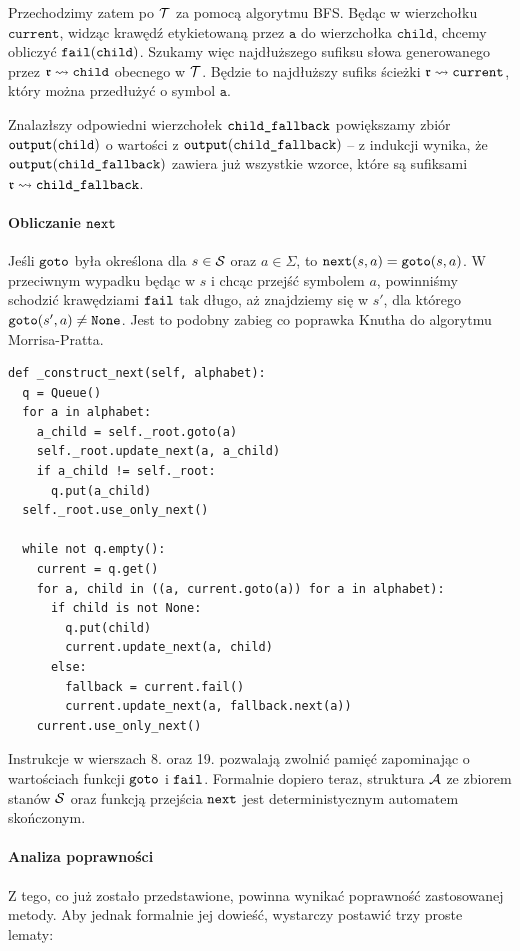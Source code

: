 Przechodzimy zatem po $\operatorname{\mathcal{T}}$ za pomocą algorytmu BFS. Będąc w wierzchołku $\texttt{current}$, widząc krawędź etykietowaną przez $\texttt{a}$ do wierzchołka $\texttt{child}$, chcemy obliczyć $\operatorname{\texttt{fail}}(\texttt{child})$. Szukamy więc najdłuższego sufiksu słowa generowanego przez $\operatorname{\mathfrak{r}}\rightsquigarrow\texttt{child}$ obecnego w $\operatorname{\mathcal{T}}$. Będzie to najdłuższy sufiks ścieżki $\operatorname{\mathfrak{r}}\rightsquigarrow\texttt{current}$, który można przedłużyć o symbol $\texttt{a}$.

Znalazłszy odpowiedni wierzchołek $\texttt{child\textunderscore fallback}$ powiększamy zbiór $\operatorname{\texttt{output}}(\texttt{child})$ o wartości z  $\operatorname{\texttt{output}}(\texttt{child\textunderscore fallback})$ -- z indukcji wynika, że $\operatorname{\texttt{output}}(\texttt{child\textunderscore fallback})$ zawiera już wszystkie wzorce, które są sufiksami $\operatorname{\mathfrak{r}}\rightsquigarrow\texttt{child\textunderscore fallback}$.

\paragraph{Obliczanie $\operatorname{\texttt{next}}$}

Jeśli $\operatorname{\texttt{goto}}$ była określona dla $s\in\operatorname{\mathcal{S}}$ oraz $a\in\Sigma$, to $\operatorname{\texttt{next}}(s, a) = \operatorname{\texttt{goto}}(s, a)$. W przeciwnym wypadku będąc w $s$ i chcąc przejść symbolem $a$, powinniśmy schodzić krawędziami $\operatorname{\texttt{fail}}$ tak długo, aż znajdziemy się w $s'$, dla którego $\operatorname{\texttt{goto}}(s', a)\neq\operatorname{\texttt{None}}$. Jest to podobny zabieg co poprawka Knutha do algorytmu Morrisa-Pratta.
\begin{verbatim}
def _construct_next(self, alphabet):
  q = Queue()
  for a in alphabet:
    a_child = self._root.goto(a)
    self._root.update_next(a, a_child)
    if a_child != self._root:
      q.put(a_child)
  self._root.use_only_next()

  while not q.empty():
    current = q.get()
    for a, child in ((a, current.goto(a)) for a in alphabet):
      if child is not None:
        q.put(child)
        current.update_next(a, child)
      else:
        fallback = current.fail()
        current.update_next(a, fallback.next(a))
    current.use_only_next()
\end{verbatim}

Instrukcje w wierszach 8. oraz 19. pozwalają zwolnić pamięć zapominając o wartościach funkcji $\operatorname{\texttt{goto}}$ i $\operatorname{\texttt{fail}}$. Formalnie dopiero teraz, struktura $\operatorname{\mathcal{A}}$ ze zbiorem stanów $\operatorname{\mathcal{S}}$ oraz funkcją przejścia $\operatorname{\texttt{next}}$ jest deterministycznym automatem skończonym.

\paragraph{Analiza poprawności}
Z tego, co już zostało przedstawione, powinna wynikać poprawność zastosowanej metody. Aby jednak formalnie jej dowieść, wystarczy postawić trzy proste lematy:


